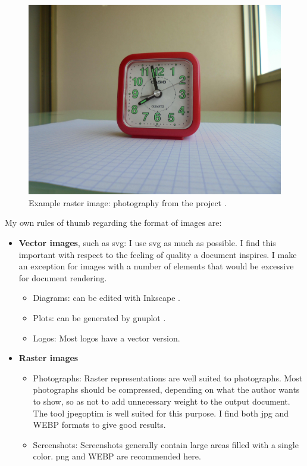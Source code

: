 \begin{figure}
\includegraphics[width=\textwidth]{images/photo-alarm-clock.jpg}
\caption{\label{fig:photo} Example raster image: photography from the
project \cite{thomashoullier/alarm-clock}.}
\end{figure}

My own rules of thumb regarding the format of images are:
\begin{itemize}
\item \textbf{Vector images}, such as \gls{svg}: I use \gls{svg} as much
as possible. I find this important with respect to the feeling of quality
a document inspires. I make an exception for images with a number of elements
that would be excessive for document rendering.
\begin{itemize}
\item Diagrams: can be edited with Inkscape \cite{inkscape}.
\item Plots: can be generated by gnuplot \cite{gnuplot}.
\item Logos: Most logos have a vector version.
\end{itemize}
\item \textbf{Raster images}
\begin{itemize}
\item Photographs: Raster representations are well suited to photographs.
      Most photographs should be compressed, depending on what the author
      wants to show, so as not to add unnecessary weight to the output document.
      The tool jpegoptim \cite{tjko/jpegoptim} is well suited for this purpose.
      I find both \gls{jpg} and WEBP formats to give good results.
\item Screenshots: Screenshots generally contain large areas filled with a
      single color. \gls{png} and WEBP are recommended here.
\end{itemize}
\end{itemize}

